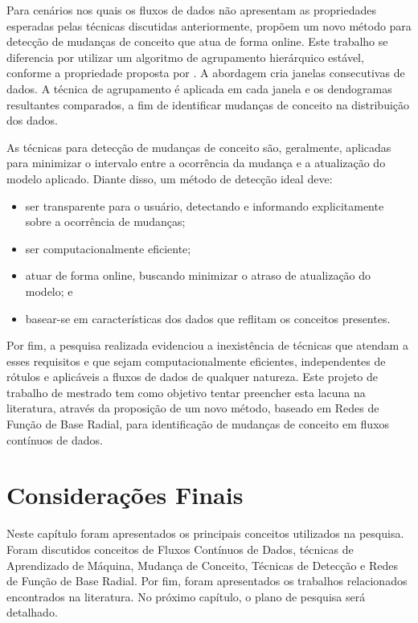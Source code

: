 \documentclass[msc, classic, a4paper]{ufbathesis}
\begin{document}
Para cenários nos quais os fluxos de dados não apresentam as propriedades esperadas pelas técnicas discutidas anteriormente,  propõem um novo método para detecção de mudanças de conceito que atua de forma online.
Este trabalho se diferencia por utilizar um algoritmo de agrupamento hierárquico estável, conforme a propriedade proposta por .
A abordagem cria janelas consecutivas de dados. A técnica de agrupamento é aplicada em cada janela e os dendogramas resultantes comparados, a fim de identificar mudanças de conceito na distribuição dos dados.

As técnicas para detecção de mudanças de conceito são, geralmente, aplicadas para minimizar o intervalo entre a ocorrência da mudança e a atualização do modelo aplicado. Diante disso, um método de detecção ideal deve:

\begin{itemize}
    \item ser transparente para o usuário, detectando e informando explicitamente sobre a ocorrência de mudanças;
    \item ser computacionalmente eficiente;
    \item atuar de forma online, buscando minimizar o atraso de atualização do modelo; e
    \item basear-se em características dos dados que reflitam os conceitos presentes.
\end{itemize}

Por fim, a pesquisa realizada evidenciou a inexistência de técnicas que atendam a esses requisitos e que sejam computacionalmente eficientes, independentes de rótulos e aplicáveis a fluxos de dados de qualquer natureza. Este projeto de trabalho de mestrado tem como objetivo tentar preencher esta lacuna na literatura, através da proposição de um novo método, baseado em Redes de Função de Base Radial,  para identificação de mudanças de conceito em fluxos contínuos de dados.

\section{Considerações Finais}

Neste capítulo foram apresentados os principais conceitos utilizados na pesquisa.
Foram discutidos conceitos de Fluxos Contínuos de Dados,
técnicas de Aprendizado de Máquina,
Mudança de Conceito,
Técnicas de Detecção e Redes de Função de Base Radial.
Por fim, foram apresentados os trabalhos relacionados encontrados na literatura.
No próximo capítulo, o plano de pesquisa será detalhado.
\end{document}
